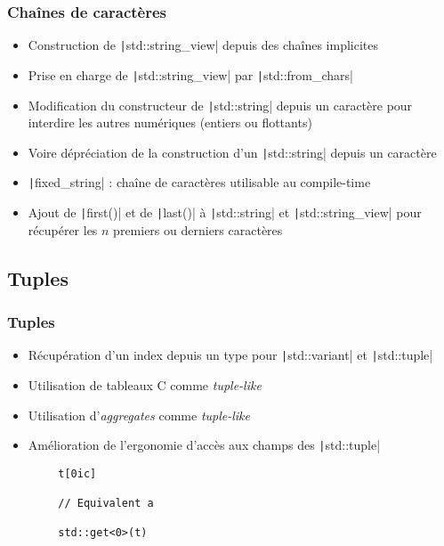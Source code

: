 \documentclass[C++.tex]{subfiles}
\begin{document}
\begin{frame}[fragile]
	\frametitle{Chaînes de caractères}
	\begin{itemize}
		\item Construction de \texttt|std::string_view| depuis des chaînes implicites
		\item Prise en charge de \texttt|std::string_view| par \texttt|std::from_chars|
		\item Modification du constructeur de \texttt|std::string| depuis un caractère pour interdire les autres numériques (entiers ou flottants)
		\item Voire dépréciation de la construction d'un \texttt|std::string| depuis un caractère
		\item \texttt|fixed_string| : chaîne de caractères utilisable au compile-time
		\item Ajout de \texttt|first()| et de \texttt|last()| à \texttt|std::string| et \texttt|std::string_view| pour récupérer les $n$ premiers ou derniers caractères
	\end{itemize}

\end{frame}

\subsection*{Tuples}
\begin{frame}[fragile]
	\frametitle{Tuples}
	\begin{itemize}
		\item Récupération d'un index depuis un type pour \texttt|std::variant| et \texttt|std::tuple|
		\item Utilisation de tableaux C comme \textit{tuple-like}
		\item Utilisation d'\textit{aggregates} comme \textit{tuple-like}
		\item Amélioration de l'ergonomie d'accès aux champs des \texttt|std::tuple|
	\end{itemize}

	\begin{verbatim}
		t[0ic]

		// Equivalent a

		std::get<0>(t)
	\end{verbatim}

\end{frame}
\end{document}
